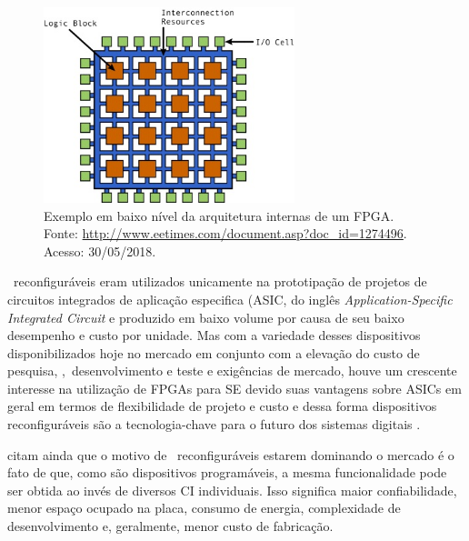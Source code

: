         \begin{figure}[h] \centering
            \includegraphics[width=0.65\textwidth]{img/rt-arch_fpga.jpg}
            \caption{Exemplo em baixo nível da arquitetura internas de um FPGA. Fonte: \url{http://www.eetimes.com/document.asp?doc_id=1274496}. Acesso: 30/05/2018.}
            \label{fig:rb-arch_fpga}
        \end{figure}
    
    
    
        \Hardwares\ reconfiguráveis eram utilizados unicamente na prototipação de projetos de circuitos integrados de aplicação especifica (ASIC, do inglês \textit{Application-Specific Integrated Circuit} e produzido em baixo volume por causa de seu baixo desempenho e custo por unidade.
        Mas com a variedade desses dispositivos disponibilizados hoje no mercado em conjunto com a elevação do custo de pesquisa, \design,\ desenvolvimento e teste e exigências de mercado, houve um crescente interesse na utilização de FPGAs para SE devido suas vantagens sobre ASICs em geral em termos de flexibilidade de projeto e custo e dessa forma dispositivos reconfiguráveis são a tecnologia-chave para o futuro dos sistemas digitais \citep{Mei2000, tocci2003sistemas}.
        
        \citet{tocci2003sistemas, Plessl2003} citam ainda que o motivo de \hardwares\ reconfiguráveis estarem dominando o mercado é o fato de que, como são dispositivos programáveis, a mesma funcionalidade pode ser obtida ao invés de diversos CI individuais.
        Isso significa maior confiabilidade, menor espaço ocupado na placa, consumo de energia, complexidade de desenvolvimento e, geralmente, menor custo de fabricação.
        
        
    
